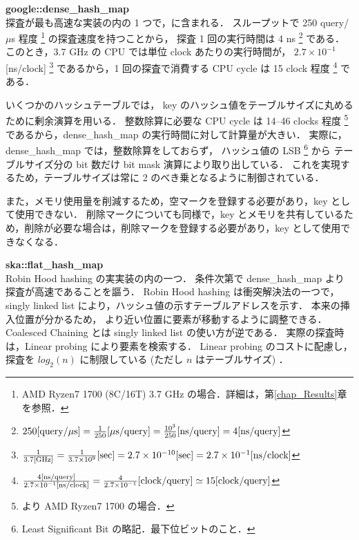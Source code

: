 {\bf google::dense\_hash\_map}
\samepage \\ \indent
探査が最も高速な実装の内の 1 つで，\cite{sparsehash2005}に含まれる．
スループットで 250 query/$\mu$s 程度
\footnote{AMD Ryzen7 1700 (8C/16T) 3.7 GHz の場合．詳細は，第\ref{chap_Results}章を参照．}
の探査速度を持つことから，
探査 1 回の実行時間は 4 ns
\footnote{
  $
    250{\rm [query \slash \mu s]}
    = \frac{1}{250} {\rm [\mu s \slash query]}
    = \frac{10^3}{250} {\rm [ns \slash query]}
    = 4 {\rm [ns \slash query]}
  $
}
である．このとき，3.7 GHz の CPU では単位 clock あたりの実行時間が，
$2.7 \times 10^{-1}$ [ns/clock]
\footnote{
  $
    \frac{1}{3.7 {\rm [GHz]}}
    = \frac{1}{3.7 \times 10^9}{\rm [sec]}
    = 2.7 \times 10^{-10}{\rm [sec]}
    = 2.7 \times 10^{-1}{\rm [ns/clock]}
  $
}
であるから，1 回の探査で消費する CPU cycle は
15 clock 程度
\footnote{
  $
    \frac{ 4 {\rm [ns/query]} }{ 2.7 \times 10^{-1} {\rm [ns/clock]} }
    = \frac{ 4 }{ 2.7 \times 10^{-1} } {\rm [clock/query]}
    \simeq 15 {\rm [clock/query]}
  $
}
である．

いくつかのハッシュテーブルでは，
key のハッシュ値をテーブルサイズに丸めるために剰余演算を用いる．
整数除算に必要な CPU cycle は 14--46 clocks 程度
\footnote{
  \cite{AgnerFog2018}より AMD Ryzen7 1700 の場合．
}
であるから，dense\_hash\_map の実行時間に対して計算量が大きい．
実際に，
dense\_hash\_map では，整数除算をしておらず，
ハッシュ値の LSB \footnote{Least Significant Bit の略記．最下位ビットのこと．} から
テーブルサイズ分の bit 数だけ bit mask 演算により取り出している．
これを実現するため，テーブルサイズは常に 2 のべき乗となるように制御されている．

また，メモリ使用量を削減するため，空マークを登録する必要があり，key として使用できない．
削除マークについても同様で，key とメモリを共有しているため，削除が必要な場合は，削除マークを登録する必要があり，key として使用できなくなる．

{\bf ska::flat\_hash\_map}
\samepage \\ \indent
Robin Hood hashing の実実装の内の一つ．
条件次第で dense\_hash\_map より探査が高速であることを謳う．
Robin Hood hashing は衝突解決法の一つで，
singly linked list により，ハッシュ値の示すテーブルアドレスを示す．
本来の挿入位置が分かるため，
より近い位置に要素が移動するように調整できる．
Coalesced Chaining とは singly linked list の使い方が逆である．
実際の探査時は，Linear probing により要素を検索する．
Linear probing のコストに配慮し，
探査を $log_2(n)$ に制限している (ただし $n$ はテーブルサイズ) \cite{Skarupke2017}．

